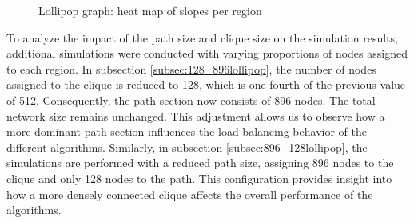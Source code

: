 \begin{figure}
    \centering
    \caption{Lollipop graph: heat map of slopes per region}
    \label{fig:lollipopslopes}
\end{figure}

To analyze the impact of the path size and clique size on the simulation results, additional simulations were conducted with varying proportions of nodes assigned to each region. In subsection \ref{subsec:128_896lollipop}, the number of nodes assigned to the clique is reduced to 128, which is one-fourth of the previous value of 512. Consequently, the path section now consists of 896 nodes. The total network size remains unchanged. This adjustment allows us to observe how a more dominant path section influences the load balancing behavior of the different algorithms. Similarly, in subsection \ref{subsec:896_128lollipop}, the simulations are performed with a reduced path size, assigning 896 nodes to the clique and only 128 nodes to the path. This configuration provides insight into how a more densely connected clique affects the overall performance of the algorithms.

